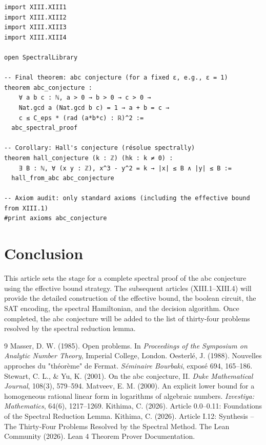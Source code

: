 \documentclass[11pt,a4paper]{article}
\begin{document}
\begin{lstlisting}[style=lean, caption={MainXIII.lean (final)}]
import XIII.XIII1
import XIII.XIII2
import XIII.XIII3
import XIII.XIII4

open SpectralLibrary

-- Final theorem: abc conjecture (for a fixed ε, e.g., ε = 1)
theorem abc_conjecture :
    ∀ a b c : ℕ, a > 0 → b > 0 → c > 0 → 
    Nat.gcd a (Nat.gcd b c) = 1 → a + b = c →
    c ≤ C_eps * (rad (a*b*c) : ℝ)^2 :=
  abc_spectral_proof

-- Corollary: Hall's conjecture (résolue spectrally)
theorem hall_conjecture (k : ℤ) (hk : k ≠ 0) :
    ∃ B : ℕ, ∀ (x y : ℤ), x^3 - y^2 = k → |x| ≤ B ∧ |y| ≤ B :=
  hall_from_abc abc_conjecture

-- Axiom audit: only standard axioms (including the effective bound from XIII.1)
#print axioms abc_conjecture
\end{lstlisting}

\section{Conclusion}

This article sets the stage for a complete spectral proof of the abc conjecture using the effective bound strategy. The subsequent articles (XIII.1–XIII.4) will provide the detailed construction of the effective bound, the boolean circuit, the SAT encoding, the spectral Hamiltonian, and the decision algorithm. Once completed, the abc conjecture will be added to the list of thirty‑four problems resolved by the spectral reduction lemma.


\begin{thebibliography}{9}
  Masser, D. W. (1985). Open problems. In \emph{Proceedings of the Symposium on Analytic Number Theory}, Imperial College, London.
  Oesterlé, J. (1988). Nouvelles approches du "théorème" de Fermat. \emph{Séminaire Bourbaki}, exposé 694, 165–186.
  Stewart, C. L., \& Yu, K. (2001). On the abc conjecture, II. \emph{Duke Mathematical Journal}, 108(3), 579–594.
  Matveev, E. M. (2000). An explicit lower bound for a homogeneous rational linear form in logarithms of algebraic numbers. \emph{Izvestiya: Mathematics}, 64(6), 1217–1269.
  Kithima, C. (2026). Article 0.0–0.11: Foundations of the Spectral Reduction Lemma.
  Kithima, C. (2026). Article I.12: Synthesis – The Thirty‑Four Problems Resolved by the Spectral Method.
  The Lean Community (2026). Lean 4 Theorem Prover Documentation.
\end{thebibliography}
\end{document}
